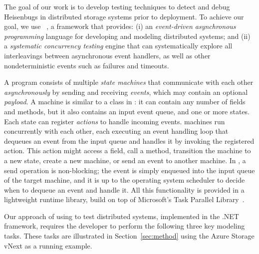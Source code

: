 The goal of our work is to develop testing techniques to detect and debug Heisenbugs in distributed storage systems prior to deployment.
To achieve our goal, we use \psharp~\cite{deligiannis2015psharp}, a framework that provides: (i) an \emph{event-driven asynchronous programming} language for developing and modeling distributed systems; and (ii) a \emph{systematic concurrency testing} engine that can systematically explore all interleavings between asynchronous event handlers, as well as other nondeterministic events such as failures and timeouts.

A \psharp program consists of multiple \emph{state machines} that communicate with each other \emph{asynchronously} by sending and receiving \emph{events}, which may contain an optional \emph{payload}. A \psharp machine is similar to a class in \csharp: it can contain any number of fields and methods, but it also contains an input event queue, and one or more states. Each state can register \emph{actions} to handle incoming events. \psharp machines run concurrently with each other, each executing an event handling loop that dequeues an event from the input queue and handles it by invoking the registered action. This action might access a field, call a method, transition the machine to a new state, create a new machine, or send an event to another machine. In \psharp, a send operation is non-blocking; the event is simply enqueued into the input queue of the target machine, and it is up to the operating system scheduler to decide when to dequeue an event and handle it. All this functionality is provided in a lightweight runtime library, build on top of Microsoft's Task Parallel Library~\cite{leijen2009tpl}.

Our approach of using \psharp to test distributed systems, implemented in the .NET framework, requires the developer to perform the following three key modeling tasks. These tasks are illustrated in Section~\ref{sec:method} using the Azure Storage vNext as a running example.

